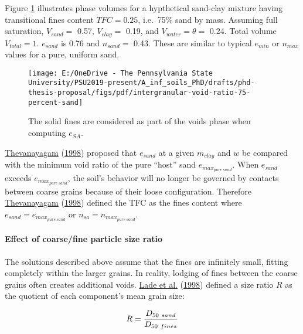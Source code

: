 \documentclass[
  letterpaper,
  openany]{book}
\begin{document}
Figure \ref{fig:intergranular-void-ratio-diagram} illustrates phase volumes for a hypthetical sand-clay mixture having transitional fines content \(TFC=0.25\), i.e.~75\% sand by mass.
Assuming full saturation, \(V_{sand}=\) 0.57, \(V_{clay}=\) 0.19, and \(V_{water}=\theta=\) 0.24. Total volume \(V_{total}=1\). \(e_{sand}\) is 0.76 and \(n_{sand}=\) 0.43.
These are similar to typical \(e_{min}\) or \(n_{max}\) values for a pure, uniform sand.

\begin{figure}[hptb]

{\centering \texttt{[image: E:/OneDrive - The Pennsylvania State University/PSU2019-present/A\_inf\_soils\_PhD/drafts/phd-thesis-proposal/figs/pdf/intergranular-void-ratio-75-percent-sand]} 

}

\caption[Intergranular void ratio of a sand-clay mixture.]{The solid fines are considered as part of the voids phase when computing $e_{SA}$.}\label{fig:intergranular-void-ratio-diagram}
\end{figure}

\protect\hyperlink{ref-Thevanayagam1998}{Thevanayagam} (\protect\hyperlink{ref-Thevanayagam1998}{1998}) proposed that \(e_{sand}\) at a given \(m_{clay}\) and \(w\) be compared with the minimum void ratio of the pure ``host'' sand \(e_{max_{pure~sand}}\).
When \(e_{sand}\) exceeds \(e_{max_{pure~sand}}\), the soil's behavior will no longer be governed by contacts between coarse grains because of their loose configuration.
Therefore \protect\hyperlink{ref-Thevanayagam1998}{Thevanayagam} (\protect\hyperlink{ref-Thevanayagam1998}{1998}) defined the TFC as the fines content where \(e_{sand}=e_{max_{pure~sand}}\) or \(n_{sa} = n_{{max}_{pure~sand}}\).

\hypertarget{tfc-size-ratio}{%
\paragraph{Effect of coarse/fine particle size ratio}\label{tfc-size-ratio}}

The solutions described above assume that the fines are infinitely small, fitting completely within the larger grains.
In reality, lodging of fines between the coarse grains often creates additional voids.
\protect\hyperlink{ref-Lade1998}{Lade et al.} (\protect\hyperlink{ref-Lade1998}{1998}) defined a size ratio \(R\) as the quotient of each component's mean grain size:

\begin{equation}
R=\frac{D_{50~sand}}{D_{50~fines}} \\
\label{eq:tfc-size-ratio}
\end{equation}
\end{document}
